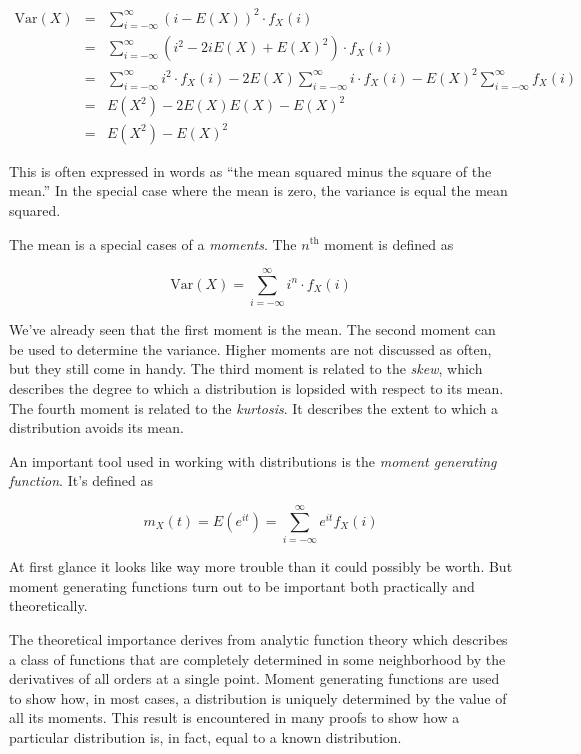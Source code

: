 \documentclass[]{article}
\begin{document}
\begin{eqnarray}
\mbox{Var}(X) & = & \sum_{i=-\infty}^{\infty} (i - E(X))^2 \cdot f_X(i) \nonumber \\
   & = & \sum_{i=-\infty}^{\infty} (i^2 - 2iE(X) + E(X)^2) \cdot f_X(i) \nonumber \\
   & = & \sum_{i=-\infty}^{\infty} i^2 \cdot f_X(i) 
       - 2E(X) \sum_{i=-\infty}^{\infty} i \cdot f_X(i)
       - E(X)^2 \sum_{i=-\infty}^{\infty} f_X(i) \nonumber \\
   & = & E(X^2) - 2E(X) E(X) - E(X)^2 \nonumber \\
   & = & E(X^2) - E(X)^2   \label{discrete_var2}
\end{eqnarray}

This is often expressed in words as ``the mean squared minus the
square of the mean.''  In the special case where the mean is zero,
the variance is equal the mean squared.

The mean is a special cases of a \emph{moments}.
The $n^{\mbox{th}}$ moment is defined as

$$
\mbox{Var}(X) = \sum_{i = -\infty}^{\infty} i^n \cdot f_X(i)
$$

We've already seen that the first moment is the mean.
The second moment can be used to determine the variance.
Higher moments are not
discussed as often, but they still come in handy.  The
third moment is related to the \emph{skew}, which describes
the degree
to which a distribution is lopsided with respect to its
mean.  The fourth moment is related to the \emph{kurtosis}.  It
describes the extent to which a distribution avoids its mean.

An important tool used in working with distributions is the
\emph{moment generating function}.  It's defined as

\begin{equation} \label{discrete_mgf}
m_X(t) = E(e^{it}) = \sum_{i=-\infty}^{\infty} e^{it} f_X(i)
\end{equation}

At first glance it looks like way more trouble than it could
possibly be worth.  But moment generating functions turn out
to be important both practically and theoretically.

The theoretical importance derives from analytic function
theory which describes a class of functions that are completely
determined in some neighborhood by the derivatives of all
orders at a single point.  Moment generating functions are
used to show how, in most cases, a distribution is uniquely
determined by the value of all its moments.  This result
is encountered in many proofs to show how a particular
distribution is, in fact, equal to a known distribution.
\end{document}
